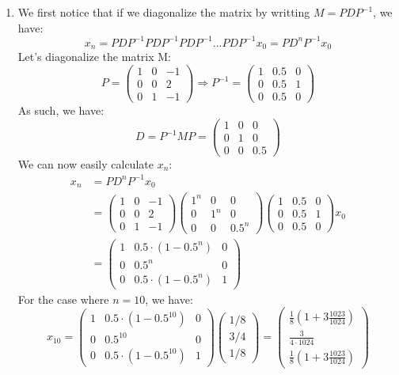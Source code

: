 \documentclass[11pt, legalpaper]{article}
\begin{document}
\begin{enumerate}
    \item We first notice that if we diagonalize the matrix by writting $M=PDP^{-1}$, we have:
    $$x_n=PDP^{-1}PDP^{-1}PDP^{-1}...PDP^{-1}x_0=PD^nP^{-1}x_0$$
    Let's diagonalize the matrix M:
    $$P=\begin{pmatrix}
        1 & 0 & -1 \\
        0 & 0 & 2 \\
        0 & 1 & -1
    \end{pmatrix} \Rightarrow  P^{-1}= \begin{pmatrix}
        1 & 0.5 & 0 \\
        0 & 0.5 & 1 \\
        0 & 0.5 & 0
    \end{pmatrix}$$
    As such, we have:
    $$D=P^{-1}M P=\begin{pmatrix}
        1 & 0 & 0 \\
        0 & 1 & 0 \\
        0 & 0 & 0.5
    \end{pmatrix}$$
    We can now easily calculate $x_n$:
    \begin{align*}
        x_n  &=PD^nP^{-1}x_0\\
                &=\begin{pmatrix}
        1 & 0 & -1 \\
        0 & 0 & 2 \\
        0 & 1 & -1
    \end{pmatrix}\begin{pmatrix}
        1^n & 0 & 0 \\
        0 & 1^n & 0 \\
        0 & 0 & 0.5^n
    \end{pmatrix}\begin{pmatrix}
        1 & 0.5 & 0 \\
        0 & 0.5 & 1 \\
        0 & 0.5 & 0
    \end{pmatrix}x_0\\
    &=\begin{pmatrix}
        1 & 0.5\cdot(1-0.5^n) & 0 \\
        0 & 0.5^n & 0 \\
        0 & 0.5\cdot(1-0.5^n) & 1
    \end{pmatrix}
    \end{align*}
    For the case where $n=10$, we have:
    $$\boxed{x_{10}=\begin{pmatrix}
        1 & 0.5\cdot(1-0.5^{10}) & 0 \\
        0 & 0.5^{10} & 0 \\
        0 & 0.5\cdot(1-0.5^{10}) & 1
    \end{pmatrix} \begin{pmatrix} 1/8 \\ 3/4 \\ 1/8 \end{pmatrix}=\begin{pmatrix}\frac{1}{8}(1+3\frac{1023}{1024}) \\ \frac{3}{4\cdot 1024} \\ \frac{1}{8}(1+3\frac{1023}{1024})\end{pmatrix}}$$


\end{enumerate}
\end{document}

